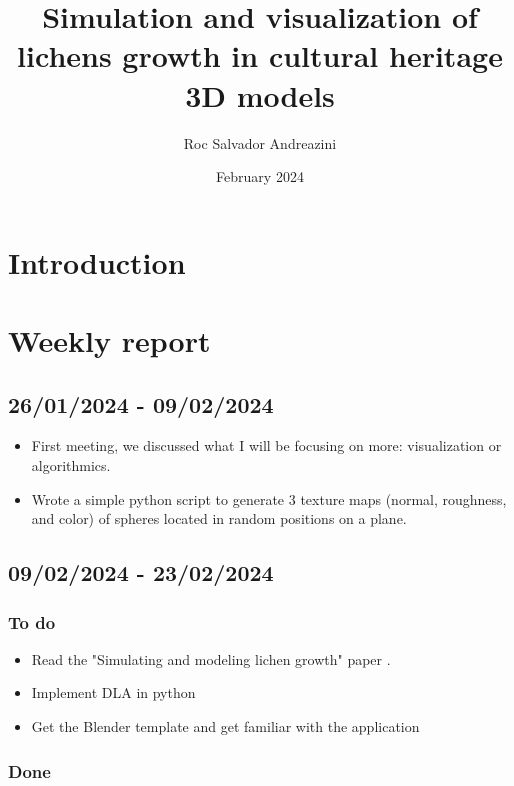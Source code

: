 \documentclass{article}
\title{Simulation and visualization of lichens growth in cultural heritage 3D models}
\author{Roc Salvador Andreazini}
\date{February 2024}
\begin{document}
\maketitle

\tableofcontents

\newpage

\section{Introduction}

\section{Weekly report}

\subsection{26/01/2024 - 09/02/2024}

\begin{itemize}
    \item First meeting, we discussed what I will be focusing on more: visualization or algorithmics.
    \item Wrote a simple python script to generate 3 texture maps (normal, roughness, and color) of spheres located in random positions on a plane.
\end{itemize}

\subsection{09/02/2024 - 23/02/2024}

\subsubsection{To do}

\begin{itemize}
    \item Read the "Simulating and modeling lichen growth" paper \cite{Simulating-and-modeling-lichen-growth}.
    \item Implement DLA in python
    \item Get the Blender template and get familiar with the application
\end{itemize}

\subsubsection{Done}

\newpage


\end{document}
